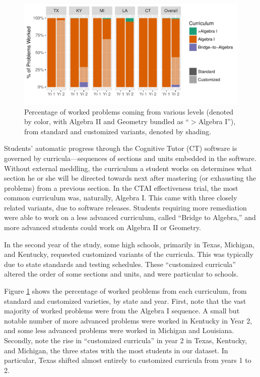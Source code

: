 \documentclass[12pt]{article}\usepackage[]{graphicx}\usepackage[]{color}
\makeatletter
\def\maxwidth{ %
  \ifdim\Gin@nat@width>\linewidth
    \linewidth
  \else
    \Gin@nat@width
  \fi
}
\makeatother
\begin{document}
\begin{figure}
  \centering

\includegraphics[width=\maxwidth]{figure/curricula-1} 

\caption{Percentage of worked problems coming from various levels
  (denoted by color, with Algebra II and Geometry bundled as ``$>$Algebra I''), from
  standard and customized variants, denoted by shading.}
\label{fig:curricula}
\end{figure}

Students' automatic progress through the Cognitive Tutor (CT) software is governed by
curricula---sequences of sections and units embedded in the software.
Without external meddling, the curriculum a student works on
determines what section he or she will be directed towards next after
mastering (or exhausting the problems) from a previous section.
In the CTAI effectiveness trial, the most common curriculum was,
naturally, Algebra I.
This came with three closely related variants, due to software releases.
Students requiring more remediation were able to work on a less
advanced curriculum, called ``Bridge to Algebra,'' and more advanced
students could work on Algebra II or Geometry.

In the second year of the study, some high schools, primarily in
Texas, Michigan, and Kentucky, requested customized variants of the
curricula.
This was typically due to state standards and testing schedules.
These ``customized curricula'' altered the order of some sections and
units, and were particular to schools.

Figure \ref{fig:curricula} shows the percentage of worked problems
from each curriculum, from standard and customized varieties, by state
and year.
First, note that the vast majority of worked problems were from the
Algebra I sequence.
A small but notable number of more advanced problems were worked in
Kentucky in Year 2, and some less advanced problems were worked in
Michigan and Louisiana.
Secondly, note the rise in ``customized curricula'' in year 2 in
Texas, Kentucky, and Michigan, the three states with the most students
in our dataset.
In particular, Texas shifted almost entirely to customized curricula
from years 1 to 2.
\end{document}
